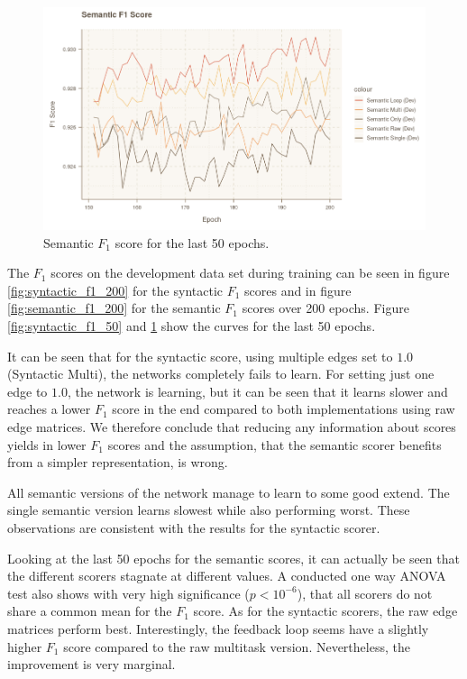 \documentclass[11pt]{scrartcl}
\begin{document}
\begin{figure}[hbt]
	\center
	\includegraphics[width=1.0\textwidth]{img/semantic_f1_50.png}
	\caption{Semantic $F_1$ score for the last 50 epochs.}
	\label{fig:semantic_f1_50}
\end{figure}

The $F_1$ scores on the development data set during training can be seen in figure \ref{fig:syntactic_f1_200} for the syntactic $F_1$ scores and in figure \ref{fig:semantic_f1_200} for the semantic $F_1$ scores over 200 epochs. Figure \ref{fig:syntactic_f1_50} and \ref{fig:semantic_f1_50} show the curves for the last 50 epochs.

It can be seen that for the syntactic score, using multiple edges set to $1.0$ (Syntactic Multi), the networks completely fails to learn. For setting just one edge to $1.0$, the network is learning, but it can be seen that it learns slower and reaches a lower $F_1$ score in the end compared to both implementations using raw edge matrices. We therefore conclude that reducing any information about scores yields in lower $F_1$ scores and the assumption, that the semantic scorer benefits from a simpler representation, is wrong.

All semantic versions of the network manage to learn to some good extend. The single semantic version learns slowest while also performing worst. These observations are consistent with the results for the syntactic scorer.

Looking at the last 50 epochs for the semantic scores, it can actually be seen that the different scorers stagnate at different values. A conducted one way ANOVA test also shows with very high significance ($p < 10^{-6}$), that all scorers do not share a common mean for the $F_1$ score. As for the syntactic scorers, the raw edge matrices perform best. Interestingly, the feedback loop seems have a slightly higher $F_1$ score compared to the raw multitask version. Nevertheless, the improvement is very marginal.
\end{document}
